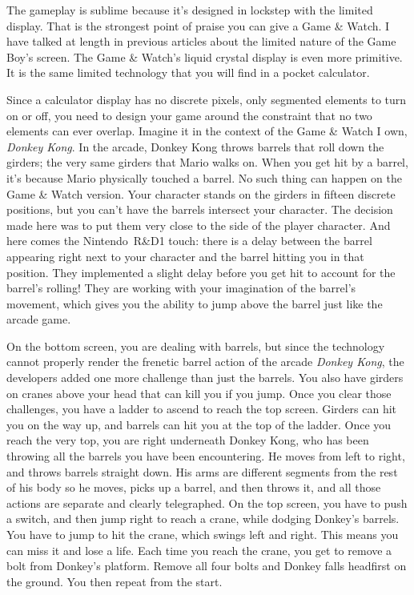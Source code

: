 \documentclass{book}
\begin{document}
The gameplay is sublime because it’s designed in lockstep with the limited display. That is the strongest point of praise you can give a Game \& Watch. I have talked at length in previous articles about the limited nature of the Game Boy’s screen. The Game \& Watch’s liquid crystal display is even more primitive. It is the same limited technology that you will find in a pocket calculator.\par
Since a calculator display has no discrete pixels, only segmented elements to turn on or off, you need to design your game around the constraint that no two elements can ever overlap. Imagine it in the context of the Game \& Watch I own, \emph{Donkey Kong}. In the arcade, Donkey Kong throws barrels that roll down the girders; the very same girders that Mario walks on. When you get hit by a barrel, it’s because Mario physically touched a barrel. No such thing can happen on the Game \& Watch version. Your character stands on the girders in fifteen discrete positions, but you can’t have the barrels intersect your character. The decision made here was to put them very close to the side of the player character. And here comes the Nintendo~R\&D1 touch: there is a delay between the barrel appearing right next to your character and the barrel hitting you in that position. They implemented a slight delay before you get hit to account for the barrel’s rolling! They are working with your imagination of the barrel’s movement, which gives you the ability to jump above the barrel just like the arcade game.\par
On the bottom screen, you are dealing with barrels, but since the technology cannot properly render the frenetic barrel action of the arcade \emph{Donkey Kong}, the developers added one more challenge than just the barrels. You also have girders on cranes above your head that can kill you if you jump. Once you clear those challenges, you have a ladder to ascend to reach the top screen. Girders can hit you on the way up, and barrels can hit you at the top of the ladder. Once you reach the very top, you are right underneath Donkey Kong, who has been throwing all the barrels you have been encountering. He moves from left to right, and throws barrels straight down. His arms are different segments from the rest of his body so he moves, picks up a barrel, and then throws it, and all those actions are separate and clearly telegraphed. On the top screen, you have to push a switch, and then jump right to reach a crane, while dodging Donkey’s barrels. You have to jump to hit the crane, which swings left and right. This means you can miss it and lose a life. Each time you reach the crane, you get to remove a bolt from Donkey’s platform. Remove all four bolts and Donkey falls headfirst on the ground. You then repeat from the start.\par
\end{document}
